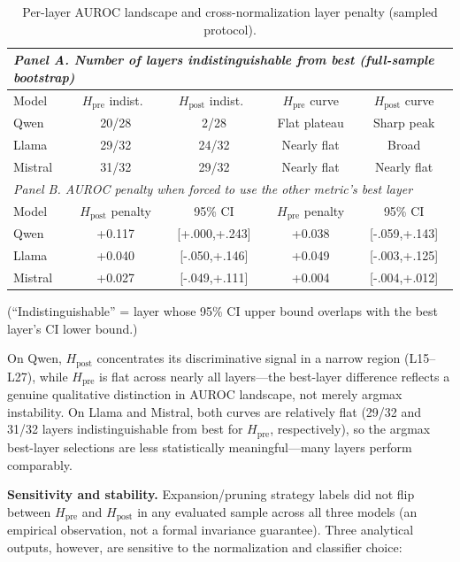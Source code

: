 \documentclass{ieeeaccess}
\newcommand{\Hpre}{H_{\text{pre}}}
\newcommand{\Hpost}{H_{\text{post}}}
\begin{document}
\begin{table}[!ht]
\centering
\caption{Per-layer AUROC landscape and cross-normalization layer penalty (sampled protocol).}
\label{tab:landscape}
\scriptsize
\setlength{\tabcolsep}{1pt}
\begin{tabular}{l cc cc}
\toprule
\multicolumn{5}{l}{\textit{Panel A. Number of layers indistinguishable from best (full-sample bootstrap)}} \\
\midrule
Model & $\Hpre$ indist.\ & $\Hpost$ indist.\ & $\Hpre$ curve & $\Hpost$ curve \\
\midrule
Qwen & 20/28 & 2/28 & Flat plateau & Sharp peak \\
Llama & 29/32 & 24/32 & Nearly flat & Broad \\
Mistral & 31/32 & 29/32 & Nearly flat & Nearly flat \\
\midrule
\multicolumn{5}{l}{\textit{Panel B. AUROC penalty when forced to use the other metric's best layer}} \\
\midrule
Model & $\Hpost$ penalty & 95\% CI & $\Hpre$ penalty & 95\% CI \\
\midrule
Qwen & +0.117 & [{+}.000,{+}.243] & +0.038 & [{-}.059,{+}.143] \\
Llama & +0.040 & [{-}.050,{+}.146] & +0.049 & [{-}.003,{+}.125] \\
Mistral & +0.027 & [{-}.049,{+}.111] & +0.004 & [{-}.004,{+}.012] \\
\bottomrule
\end{tabular}
\end{table}

(``Indistinguishable'' = layer whose 95\% CI upper bound overlaps with the best layer's CI lower bound.)

On Qwen, $\Hpost$ concentrates its discriminative signal in a narrow region (L15--L27), while $\Hpre$ is flat across nearly all layers---the best-layer difference reflects a genuine qualitative distinction in AUROC landscape, not merely argmax instability. On Llama and Mistral, both curves are relatively flat (29/32 and 31/32 layers indistinguishable from best for $\Hpre$, respectively), so the argmax best-layer selections are less statistically meaningful---many layers perform comparably.

\textbf{Sensitivity and stability.} Expansion/pruning strategy labels did not flip between $\Hpre$ and $\Hpost$ in any evaluated sample across all three models (an empirical observation, not a formal invariance guarantee). Three analytical outputs, however, are sensitive to the normalization and classifier choice:
\end{document}
